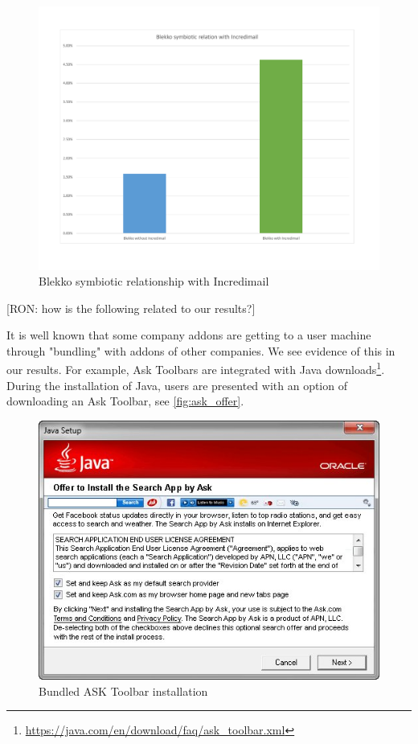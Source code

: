 \documentclass[11pt,oneside]{book}
\begin{document}
\begin{figure}[h]
\centering
\includegraphics[width=\linewidth]{figures/blekko_sym_incredi.pdf}
\caption{Blekko symbiotic relationship with Incredimail}
\label{fig:blekko_sym_incredi}
\end{figure}

[RON: how is the following related to our results?]

It is well known that some company addons are getting to a user machine through "bundling" with addons of other companies. We see evidence of this in our results. For example, Ask Toolbars are integrated with Java downloads\footnote{\url{https://java.com/en/download/faq/ask_toolbar.xml}}. During the installation of Java, users are presented with an option of downloading an Ask Toolbar, see \autoref{fig:ask_offer}.
\begin{figure}[h]
\centering
\includegraphics[scale=.8,angle=0]{figures/ask_offer.png}
\caption{Bundled ASK Toolbar installation}
\label{fig:ask_offer}
\end{figure}
\end{document}
